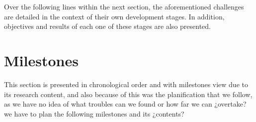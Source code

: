 	\begin{comment}
	Extend this paragraph?\\
	
	Scrap zone.\\

	As we explain in the subsection 2.2.5 *Como se ponen enlaces?* the host rol is assumed by who manage the connection, and device rol by the one who just use this connection to send and recive data and recive energy, for us, this minds a simpler programming in our MSP430 device, which code is harder to develop than android code.\\

	We decided to use 802.15.4 instead of Bluetooth for many reasons, like lower consums or aviability to create networks to cover big surfaces. But the more important one is that *shimmer have a very small battery that, with bluetooth just lasts 5 or 6 hours, but with 802.15.4 it colud lasts more than a week. Talking about the delineator device that have to be carried by the patient, the difference between charge the device 3 or 4 times every day and charge it less than once every week is more than significant.\\
	\end{comment}

	Over the following lines within the next section, the aforementioned challenges are detailed
	in the context of their own development stages. In addition, objectives and results of each one of
	these stages are also presented.
	
	\section{Milestones}	
	This section is presented in chronological order and with milestones view due to its research content, and also because of this was the planification that we follow, as we have no idea of what troubles can we found or how far we can ¿overtake? we have to plan the following milestones and its ¿contents?%

